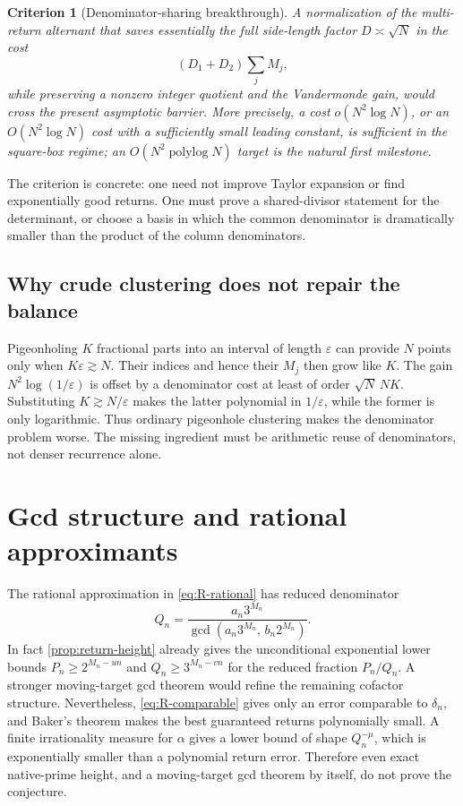 \documentclass[11pt]{article}
\newtheorem{criterion}[theorem]{Criterion}
\theoremstyle{definition}
\theoremstyle{remark}
\begin{document}
\begin{criterion}[Denominator-sharing breakthrough]\label{crit:denom-sharing}
A normalization of the multi-return alternant that saves essentially the full side-length factor $D\asymp\sqrt N$ in the cost
\[
 (D_1+D_2)\sum_jM_j,
\]
while preserving a nonzero integer quotient and the Vandermonde gain, would cross the present asymptotic barrier. More precisely, a cost $o(N^2\log N)$, or an $O(N^2\log N)$ cost with a sufficiently small leading constant, is sufficient in the square-box regime; an $O(N^2\operatorname{polylog}N)$ target is the natural first milestone.
\end{criterion}

The criterion is concrete: one need not improve Taylor expansion or find exponentially good returns. One must prove a shared-divisor statement for the determinant, or choose a basis in which the common denominator is dramatically smaller than the product of the column denominators.

\subsection{Why crude clustering does not repair the balance}

Pigeonholing $K$ fractional parts into an interval of length $\varepsilon$ can provide $N$ points only when $K\varepsilon\gtrsim N$. Their indices and hence their $M_j$ then grow like $K$. The gain $N^2\log(1/\varepsilon)$ is offset by a denominator cost at least of order $\sqrt N\,N K$. Substituting $K\gtrsim N/\varepsilon$ makes the latter polynomial in $1/\varepsilon$, while the former is only logarithmic. Thus ordinary pigeonhole clustering makes the denominator problem worse. The missing ingredient must be arithmetic reuse of denominators, not denser recurrence alone.

\section{Gcd structure and rational approximants}\label{sec:gcd}

The rational approximation in \eqref{eq:R-rational} has reduced denominator
\begin{equation}\label{eq:rho-denominator}
 Q_n=
 \frac{a_n3^{M_n}}
 {\gcd(a_n3^{M_n},\,b_n2^{M_n})}.
\end{equation}
In fact \cref{prop:return-height} already gives the unconditional exponential lower bounds $P_n\ge2^{M_n-un}$ and $Q_n\ge3^{M_n-vn}$ for the reduced fraction $P_n/Q_n$. A stronger moving-target gcd theorem would refine the remaining cofactor structure. Nevertheless, \eqref{eq:R-comparable} gives only an error comparable to $\delta_n$, and Baker's theorem makes the best guaranteed returns polynomially small. A finite irrationality measure for $\alpha$ gives a lower bound of shape $Q_n^{-\mu}$, which is exponentially smaller than a polynomial return error. Therefore even exact native-prime height, and a moving-target gcd theorem by itself, do not prove the conjecture.
\end{document}
